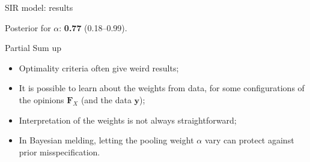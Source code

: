 \begin{frame}{SIR model: results}
\begin{figure}[!ht]
\begin{center}
\end{center}
\label{fig:SIR_results}
\end{figure}
Posterior for $\alpha$: \textbf{0.77} (0.18--0.99).
\end{frame}
\begin{frame}{Partial Sum up}
\begin{itemize}
 \item Optimality criteria often give weird results;\pause
 \item It is possible to learn about the weights from data, for some configurations of the opinions $\boldsymbol F_X$ (and the data $\boldsymbol y$);\pause
 \item Interpretation of the weights is not always straightforward;\pause
 \item In Bayesian melding, letting the pooling weight $\alpha$ vary can protect against prior misspecification.
 \end{itemize}
\end{frame}
